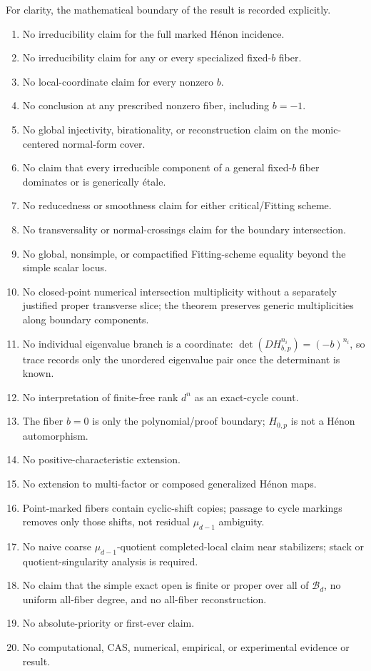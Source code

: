 \documentclass[11pt]{article}
\theoremstyle{definition}
\theoremstyle{remark}
\newcommand{\cB}{\mathcal B}
\begin{document}
For clarity, the mathematical boundary of the result is recorded explicitly.
\begin{enumerate}[label=\textbf{A\arabic*.},leftmargin=3.1em,itemsep=0.25em]
  \item No irreducibility claim for the full marked Hénon incidence.
  \item No irreducibility claim for any or every specialized fixed-$b$ fiber.
  \item No local-coordinate claim for every nonzero $b$.
  \item No conclusion at any prescribed nonzero fiber, including $b=-1$.
  \item No global injectivity, birationality, or reconstruction claim on the monic-centered normal-form cover.
  \item No claim that every irreducible component of a general fixed-$b$ fiber dominates or is generically étale.
  \item No reducedness or smoothness claim for either critical/Fitting scheme.
  \item No transversality or normal-crossings claim for the boundary intersection.
  \item No global, nonsimple, or compactified Fitting-scheme equality beyond the simple scalar locus.
  \item No closed-point numerical intersection multiplicity without a separately justified proper transverse slice; the theorem preserves generic multiplicities along boundary components.
  \item No individual eigenvalue branch is a coordinate: $\det(DH_{b,p}^{n_i})=(-b)^{n_i}$, so trace records only the unordered eigenvalue pair once the determinant is known.
  \item No interpretation of finite-free rank $d^n$ as an exact-cycle count.
  \item The fiber $b=0$ is only the polynomial/proof boundary; $H_{0,p}$ is not a Hénon automorphism.
  \item No positive-characteristic extension.
  \item No extension to multi-factor or composed generalized Hénon maps.
  \item Point-marked fibers contain cyclic-shift copies; passage to cycle markings removes only those shifts, not residual $\mu_{d-1}$ ambiguity.
  \item No naive coarse $\mu_{d-1}$-quotient completed-local claim near stabilizers; stack or quotient-singularity analysis is required.
  \item No claim that the simple exact open is finite or proper over all of $\cB_d$, no uniform all-fiber degree, and no all-fiber reconstruction.
  \item No absolute-priority or first-ever claim.
  \item No computational, CAS, numerical, empirical, or experimental evidence or result.
\end{enumerate}
\end{document}
